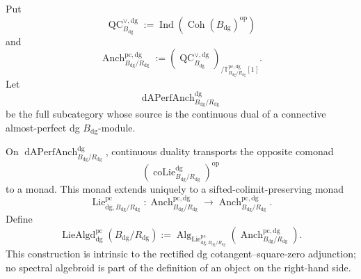 \begin{definition}
\label{def:bnla-dg-procoherent-anchors}
Put
\[
    \operatorname{QC}^{\vee,\mathrm{dg}}_{B_{\mathrm{dg}}}
    :=
    \operatorname{Ind}
    \left(
        \operatorname{Coh}(B_{\mathrm{dg}})^{\mathrm{op}}
    \right)
\]
and
\[
    \operatorname{Anch}^{\mathrm{pc,dg}}_{B_{\mathrm{dg}}/R_{\mathrm{dg}}}
    :=
    \left(
        \operatorname{QC}^{\vee,\mathrm{dg}}_{B_{\mathrm{dg}}}
    \right)_{/
      \mathbb T^{\mathrm{pc,dg}}_{B_{\mathrm{dg}}/R_{\mathrm{dg}}}[1]}.
\]
Let
\[
    \operatorname{dAPerfAnch}^{\mathrm{dg}}_{B_{\mathrm{dg}}/R_{\mathrm{dg}}}
\]
be the full subcategory whose source is the continuous dual of a connective
almost-perfect dg $B_{\mathrm{dg}}$-module.
\end{definition}

\begin{proposition}
\label{prop:bnla-relative-dg-monad-construction}
On
$\operatorname{dAPerfAnch}^{\mathrm{dg}}_{B_{\mathrm{dg}}/R_{\mathrm{dg}}}$,
continuous duality transports the opposite comonad
\[
    \left(
    \operatorname{coLie}^{\mathrm{dg}}_{B_{\mathrm{dg}}/R_{\mathrm{dg}}}
    \right)^{\mathrm{op}}
\]
to a monad.  This monad extends uniquely to a sifted-colimit-preserving monad
\[
\boxed{
    \operatorname{Lie}^{\mathrm{pc}}_{\mathrm{dg},
      B_{\mathrm{dg}}/R_{\mathrm{dg}}}:
    \operatorname{Anch}^{\mathrm{pc,dg}}_{B_{\mathrm{dg}}/R_{\mathrm{dg}}}
    \longrightarrow
    \operatorname{Anch}^{\mathrm{pc,dg}}_{B_{\mathrm{dg}}/R_{\mathrm{dg}}}.}
\]
Define
\[
\boxed{
    \operatorname{LieAlgd}^{\mathrm{pc}}_{\mathrm{dg}}
    (B_{\mathrm{dg}}/R_{\mathrm{dg}})
    :=
    \operatorname{Alg}_{
      \operatorname{Lie}^{\mathrm{pc}}_{\mathrm{dg},
      B_{\mathrm{dg}}/R_{\mathrm{dg}}}}
    \left(
      \operatorname{Anch}^{\mathrm{pc,dg}}_{B_{\mathrm{dg}}/R_{\mathrm{dg}}}
    \right).}
\]
This construction is intrinsic to the rectified dg cotangent--square-zero
adjunction; no spectral algebroid is part of the definition of an object on
the right-hand side.
\end{proposition}

